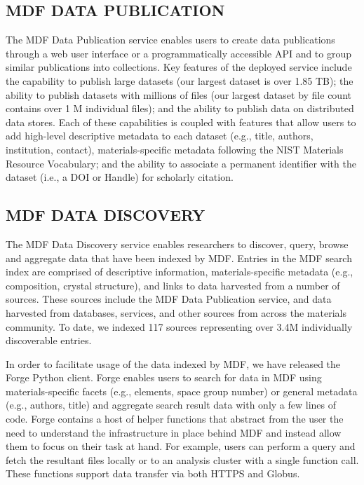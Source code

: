 \documentclass{aip-cp}
\begin{document}
\subsection{MDF DATA PUBLICATION} 
The MDF Data Publication service enables
users to create data publications through a web user interface or a
programmatically accessible API and to group similar publications into
collections. Key features of the deployed service include the capability to
publish large datasets (our largest dataset is over 1.85 TB); the ability to
publish datasets with millions of files (our largest dataset by file count
contains over 1 M individual files); and the ability to publish data on
distributed data stores. Each of these capabilities is coupled with
features that allow users to add high-level descriptive metadata to each dataset
(e.g., title, authors, institution, contact), materials-specific metadata
following the NIST Materials Resource Vocabulary; and the ability to associate
a permanent identifier with the dataset (i.e., a DOI or Handle) for scholarly
citation.

\subsection{MDF DATA DISCOVERY} 
The MDF Data Discovery service enables
researchers to discover, query, browse and aggregate data that have been
indexed by MDF. Entries in the MDF search index are comprised of descriptive
information, materials-specific metadata (e.g., composition, crystal
structure), and links to data harvested from a number of sources. These
sources include the MDF Data Publication service, and
data harvested from databases, services, and other sources from across the
materials community. To date, we indexed 117 sources representing over 3.4M
individually discoverable entries.

In order to facilitate usage of the data indexed by MDF, we have released the
Forge Python client. Forge enables users to search for data in MDF using
materials-specific facets (e.g., elements, space group number) or general
metadata (e.g., authors, title) and aggregate search result data with only a
few lines of code. Forge contains a host of helper functions that
abstract from the user the need to understand the infrastructure in place
behind MDF and instead allow them to focus on their task at hand. For example,
users can perform a query and fetch the resultant files locally or to an
analysis cluster with a single function call. These functions support data
transfer via both HTTPS and Globus.
\end{document}
